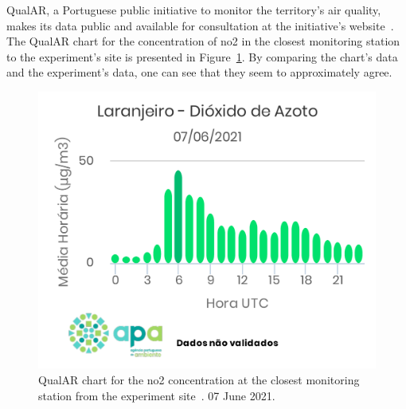 QualAR, a Portuguese public initiative to monitor the territory's air
quality, makes its data public and available for consultation at the
initiative's website~\cite{Ambiente2019}. The QualAR chart for the
concentration of \gls{no2} in the closest monitoring station to the
experiment's site is presented in Figure~\ref{fig:qualar_0706}. By
comparing the chart's data and the experiment's data, one can see that
they seem to approximately agree.

\begin{figure}[htpb]
    \centering
    \includegraphics[width=.8\textwidth]{img/pdf/no2_07jun_apa_chart.pdf}
    \caption{QualAR chart for the \gls{no2} concentration at
    the closest monitoring station from the experiment
    site~\cite{Ambiente2019}. 07 June 2021.}
    \label{fig:qualar_0706}
\end{figure}

